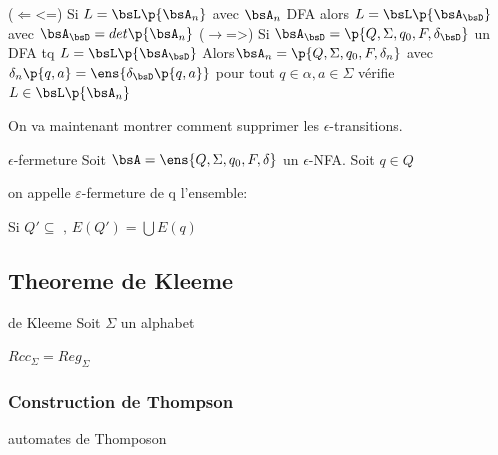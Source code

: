     \begin{nproof}
        ($\Leftarrow$<=) Si $L = \bsL \p{\bsA_n}$ avec $\bsA_n$ DFA alors $L = \bsL \p{\bsA_\bsD}$ avec $\bsA_\bsD = det \p{\bsA_n}$
        ($\rightarrow$=>) Si $\bsA_\bsD = \p{Q, \Sigma, q_0, F, \delta_\bsD}$ un DFA tq $L = \bsL \p{\bsA_\bsD}$
        Alors$\bsA_n = \p{Q, \Sigma, q_0, F, \delta_n}$ avec $\delta_n \p{q, a} = \ens{\delta_\bsD \p{q, a}}$ pour tout $q \in \alpha, a \in \Sigma$ vérifie $L \in \bsL \p{\bsA_n}$
    \end{nproof}
    
    On va maintenant montrer comment supprimer les $\epsilon$-transitions.
    
    \begin{definition}{$\epsilon$-fermeture}{}
        Soit $\bsA = \ens{Q, \Sigma, q_0, F, \delta}$ un $\epsilon$-NFA. 
        Soit $q\in Q $ %
        
        on appelle $\varepsilon$-fermeture de q l'ensemble: 
        
        
    \end{definition}
    \begin{notation}
        Si $Q' \subseteq \text{  , } E(Q') = \bigcup E(q) $ 
        
    \end{notation}
    
    
    \subsection{Theoreme de Kleeme}
    
    \begin{theorem}{de Kleeme}{}
    Soit $\Sigma$ un alphabet 
    
    
    $Rcc_\Sigma = Reg_\Sigma$
    
    
    \end{theorem}
    
    \subsubsection{Construction de Thompson}
    
    \begin{definition}{automates de Thomposon}{}
        
    \end{definition}
    
